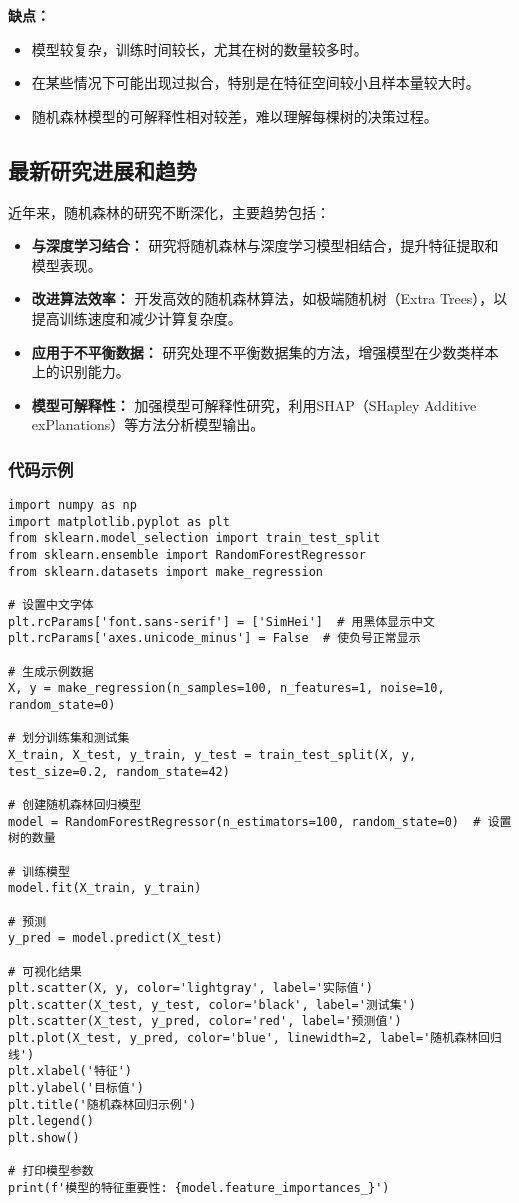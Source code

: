 \textbf{缺点：}
\begin{itemize}
    \item 模型较复杂，训练时间较长，尤其在树的数量较多时。
    \item 在某些情况下可能出现过拟合，特别是在特征空间较小且样本量较大时。
    \item 随机森林模型的可解释性相对较差，难以理解每棵树的决策过程。
\end{itemize}

\subsection*{最新研究进展和趋势}
近年来，随机森林的研究不断深化，主要趋势包括：
\begin{itemize}
    \item \textbf{与深度学习结合：} 研究将随机森林与深度学习模型相结合，提升特征提取和模型表现。
    \item \textbf{改进算法效率：} 开发高效的随机森林算法，如极端随机树（Extra Trees），以提高训练速度和减少计算复杂度。
    \item \textbf{应用于不平衡数据：} 研究处理不平衡数据集的方法，增强模型在少数类样本上的识别能力。
    \item \textbf{模型可解释性：} 加强模型可解释性研究，利用SHAP（SHapley Additive exPlanations）等方法分析模型输出。
\end{itemize}

\subsubsection{代码示例}

\begin{lstlisting}
import numpy as np
import matplotlib.pyplot as plt
from sklearn.model_selection import train_test_split
from sklearn.ensemble import RandomForestRegressor
from sklearn.datasets import make_regression

# 设置中文字体
plt.rcParams['font.sans-serif'] = ['SimHei']  # 用黑体显示中文
plt.rcParams['axes.unicode_minus'] = False  # 使负号正常显示

# 生成示例数据
X, y = make_regression(n_samples=100, n_features=1, noise=10, random_state=0)

# 划分训练集和测试集
X_train, X_test, y_train, y_test = train_test_split(X, y, test_size=0.2, random_state=42)

# 创建随机森林回归模型
model = RandomForestRegressor(n_estimators=100, random_state=0)  # 设置树的数量

# 训练模型
model.fit(X_train, y_train)

# 预测
y_pred = model.predict(X_test)

# 可视化结果
plt.scatter(X, y, color='lightgray', label='实际值')
plt.scatter(X_test, y_test, color='black', label='测试集')
plt.scatter(X_test, y_pred, color='red', label='预测值')
plt.plot(X_test, y_pred, color='blue', linewidth=2, label='随机森林回归线')
plt.xlabel('特征')
plt.ylabel('目标值')
plt.title('随机森林回归示例')
plt.legend()
plt.show()

# 打印模型参数
print(f'模型的特征重要性: {model.feature_importances_}')

\end{lstlisting}

